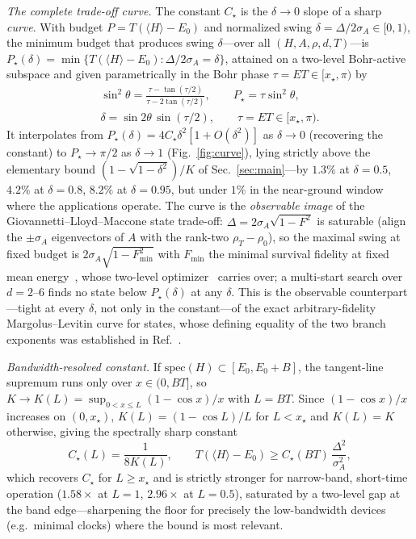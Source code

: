 \documentclass[aps,pra,twocolumn,superscriptaddress,nofootinbib,longbibliography]{revtex4-2}
\newcommand{\Ctrue}{C_{\star}}
\newcommand{\xstar}{x_{\star}}
\newcommand{\mean}[1]{\langle #1 \rangle}
\begin{document}
\medskip
\noindent\emph{The complete trade-off curve.} The constant $\Ctrue$ is the $\delta\to0$ slope of a sharp
\emph{curve}. With budget $P=T(\mean H-E_0)$ and normalized swing $\delta=\Delta/2\sigma_A\in[0,1)$, the
minimum budget that produces swing $\delta$---over all $(H,A,\rho,d,T)$---is
$P_\star(\delta)=\min\{T(\mean H-E_0):\Delta/2\sigma_A=\delta\}$, attained on a two-level Bohr-active subspace
and given parametrically in the Bohr phase $\tau=ET\in[\xstar,\pi)$ by
\begin{equation}
\begin{gathered}
\sin^2\theta=\frac{\tau-\tan(\tau/2)}{\tau-2\tan(\tau/2)},\qquad P_\star=\tau\sin^2\theta,\\[2pt]
\delta=\sin2\theta\,\sin(\tau/2),\qquad \tau=ET\in[\xstar,\pi).
\end{gathered}
\label{eq:curve}
\end{equation}
It interpolates from $P_\star(\delta)=4\Ctrue\delta^2[1+O(\delta^2)]$ as $\delta\to0$ (recovering the constant)
to $P_\star\to\pi/2$ as $\delta\to1$ (Fig.~\ref{fig:curve}), lying strictly above the elementary bound
$(1-\sqrt{1-\delta^2})/K$ of Sec.~\ref{sec:main}---by $1.3\%$ at $\delta=0.5$, $4.2\%$ at $\delta=0.8$, $8.2\%$
at $\delta=0.95$, but under $1\%$ in the near-ground window where the applications operate. The curve is the
\emph{observable image} of the Giovannetti--Lloyd--Maccone state trade-off: $\Delta=2\sigma_A\sqrt{1-F^2}$ is
saturable (align the $\pm\sigma_A$ eigenvectors of $A$ with the rank-two $\rho_T-\rho_0$), so the maximal swing
at fixed budget is $2\sigma_A\sqrt{1-F_{\min}^2}$ with $F_{\min}$ the minimal survival fidelity at fixed mean
energy~\cite{Giovannetti2003QuantumLimits}, whose two-level
optimizer~\cite{Hornedal2023MargolusLevitinArbitraryFidelity} carries over; a multi-start search over
$d=2$--$6$ finds no state below $P_\star(\delta)$ at any $\delta$. This is the observable counterpart---tight at
every $\delta$, not only in the constant---of the exact arbitrary-fidelity Margolus--Levitin curve for states,
whose defining equality of the two branch exponents was established in Ref.~\cite{Chau2023MLalpha}.

\medskip
\noindent\emph{Bandwidth-resolved constant.} If $\mathrm{spec}(H)\subset[E_0,E_0+B]$, the tangent-line
supremum runs only over $x\in(0,BT]$, so $K\to K(L)=\sup_{0<x\le L}(1-\cos x)/x$ with $L=BT$. Since
$(1-\cos x)/x$ increases on $(0,\xstar)$, $K(L)=(1-\cos L)/L$ for $L<\xstar$ and $K(L)=K$ otherwise, giving the
spectrally sharp constant
\begin{equation}
\Ctrue(L)=\frac{1}{8K(L)},\qquad T(\mean H-E_0)\ge \Ctrue(BT)\,\frac{\Delta^2}{\sigma_A^2},
\label{eq:bandwidth}
\end{equation}
which recovers $\Ctrue$ for $L\ge\xstar$ and is strictly stronger for narrow-band, short-time operation
($1.58\times$ at $L=1$, $2.96\times$ at $L=0.5$), saturated by a two-level gap at the band edge---sharpening
the floor for precisely the low-bandwidth devices (e.g.\ minimal clocks) where the bound is most relevant.
\end{document}
